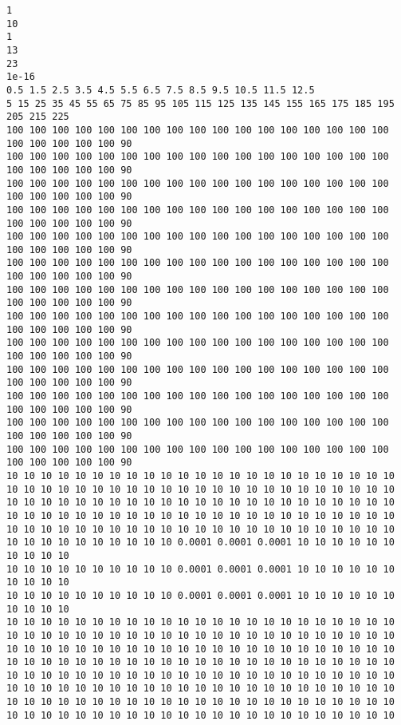 \begin{lstlisting}[caption= Input file for 2D vertical slice confined aquifer with low permeability inclusion , label=lst:2DinclusionInput]
1
10
1
13
23
1e-16
0.5 1.5 2.5 3.5 4.5 5.5 6.5 7.5 8.5 9.5 10.5 11.5 12.5
5 15 25 35 45 55 65 75 85 95 105 115 125 135 145 155 165 175 185 195 205 215 225
100 100 100 100 100 100 100 100 100 100 100 100 100 100 100 100 100 100 100 100 100 100 90
100 100 100 100 100 100 100 100 100 100 100 100 100 100 100 100 100 100 100 100 100 100 90
100 100 100 100 100 100 100 100 100 100 100 100 100 100 100 100 100 100 100 100 100 100 90
100 100 100 100 100 100 100 100 100 100 100 100 100 100 100 100 100 100 100 100 100 100 90
100 100 100 100 100 100 100 100 100 100 100 100 100 100 100 100 100 100 100 100 100 100 90
100 100 100 100 100 100 100 100 100 100 100 100 100 100 100 100 100 100 100 100 100 100 90
100 100 100 100 100 100 100 100 100 100 100 100 100 100 100 100 100 100 100 100 100 100 90
100 100 100 100 100 100 100 100 100 100 100 100 100 100 100 100 100 100 100 100 100 100 90
100 100 100 100 100 100 100 100 100 100 100 100 100 100 100 100 100 100 100 100 100 100 90
100 100 100 100 100 100 100 100 100 100 100 100 100 100 100 100 100 100 100 100 100 100 90
100 100 100 100 100 100 100 100 100 100 100 100 100 100 100 100 100 100 100 100 100 100 90
100 100 100 100 100 100 100 100 100 100 100 100 100 100 100 100 100 100 100 100 100 100 90
100 100 100 100 100 100 100 100 100 100 100 100 100 100 100 100 100 100 100 100 100 100 90
10 10 10 10 10 10 10 10 10 10 10 10 10 10 10 10 10 10 10 10 10 10 10
10 10 10 10 10 10 10 10 10 10 10 10 10 10 10 10 10 10 10 10 10 10 10
10 10 10 10 10 10 10 10 10 10 10 10 10 10 10 10 10 10 10 10 10 10 10
10 10 10 10 10 10 10 10 10 10 10 10 10 10 10 10 10 10 10 10 10 10 10
10 10 10 10 10 10 10 10 10 10 10 10 10 10 10 10 10 10 10 10 10 10 10
10 10 10 10 10 10 10 10 10 10 0.0001 0.0001 0.0001 10 10 10 10 10 10 10 10 10 10
10 10 10 10 10 10 10 10 10 10 0.0001 0.0001 0.0001 10 10 10 10 10 10 10 10 10 10
10 10 10 10 10 10 10 10 10 10 0.0001 0.0001 0.0001 10 10 10 10 10 10 10 10 10 10
10 10 10 10 10 10 10 10 10 10 10 10 10 10 10 10 10 10 10 10 10 10 10
10 10 10 10 10 10 10 10 10 10 10 10 10 10 10 10 10 10 10 10 10 10 10
10 10 10 10 10 10 10 10 10 10 10 10 10 10 10 10 10 10 10 10 10 10 10
10 10 10 10 10 10 10 10 10 10 10 10 10 10 10 10 10 10 10 10 10 10 10
10 10 10 10 10 10 10 10 10 10 10 10 10 10 10 10 10 10 10 10 10 10 10
10 10 10 10 10 10 10 10 10 10 10 10 10 10 10 10 10 10 10 10 10 10 10
10 10 10 10 10 10 10 10 10 10 10 10 10 10 10 10 10 10 10 10 10 10 10
10 10 10 10 10 10 10 10 10 10 10 10 10 10 10 10 10 10 10 10 10 10 10

\end{lstlisting}
